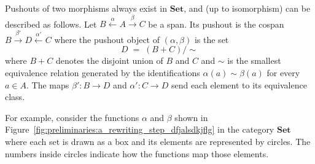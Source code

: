 \begin{example}
     Pushouts of two morphisms always exist in \(\mathbf{Set}\), and (up to isomorphism) can be described as follows. Let
    \( B \overset{\alpha}{\leftarrow} A \overset{\beta}{\rightarrow} C \) be a span. Its pushout is the cospan \( B \overset{\beta'}{\rightarrow} D \overset{\alpha'}{\leftarrow} C \) where the pushout object of \((\alpha,\beta)\) is the set
    \[
    D \;=\; (B + C)/{\sim}
    \]
    where \(B + C\) denotes the disjoint union of $B$ and $C$ and \(\sim\) is the smallest equivalence relation generated by the identifications \(\alpha(a)\sim \beta(a)\) for every \(a\in A\). The maps
    \(\beta' \colon B\to D\) and \(\alpha' \colon C\to D\) send each element to its equivalence class.

    For example, consider the functions \(\alpha\) and \(\beta\) shown in Figure~\ref{fig:preliminaries:a_rewriting_step_dfjalsdkjflg} in the category \(\mathbf{Set}\) where each set is drawn as a box and its elements are represented by circles. The numbers inside circles indicate how the functions map those elements.
    \begin{figure}[H]
      \centering 
\end{figure}
\end{example}
